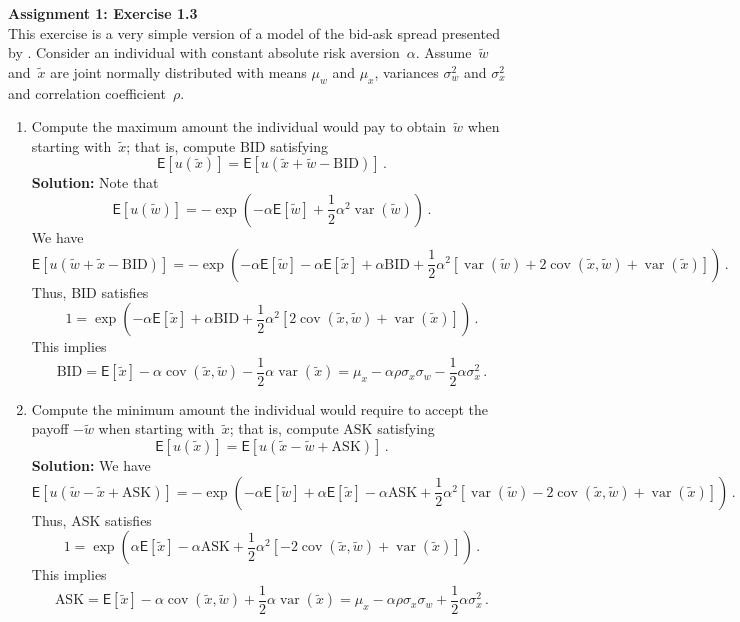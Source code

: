 \documentclass[11pt]{article}
\newcommand{\mye}{\ensuremath{\mathsf{E}}}
\newcommand{\sol}{\textbf{Solution:} \hspace{2ex}}
\theoremstyle{definition}
\DeclareMathOperator{\var}{var} \DeclareMathOperator{\stdev}{stdev}
\DeclareMathOperator{\cov}{cov} \DeclareMathOperator{\corr}{corr}
\begin{document}
%
%
\newpage\noindent \textbf{Assignment 1: Exercise 1.3}\\
\noindent 
  This exercise is a very simple version of a model of the bid-ask spread presented by \citet{Stoll_JF_1978}.
Consider an individual with constant absolute risk aversion~$\alpha$.  Assume~$\tilde{w}$ and~$\tilde{x}$ are joint normally distributed with means $\mu_w$ and $\mu_x$, variances $\sigma_w^2$ and $\sigma_x^2$ and correlation coefficient~$\rho$.
\begin{enumerate}\renewcommand{\labelenumi}{(\alph{enumi})}
\item Compute the maximum amount the individual would pay to obtain~$\tilde{w}$ when starting with~$\tilde{x}$; that is, compute $\text{BID}$ satisfying
$$\mye[u(\tilde{x})] = \mye[u(\tilde{x}+\tilde{w}-\text{BID})]\,.$$
\sol \noindent  Note that
$$\mye[u(\tilde{w})] = - \exp\left( - \alpha \mye[\tilde{w}] + \frac{1}{2}\alpha^2 \var(\tilde{w})\right)\,.$$
We have
$$\mye[u(\tilde{w}+\tilde{x}-\text{BID})] = - \exp\left( - \alpha \mye[\tilde{w}] -\alpha \mye[\tilde{x}] + \alpha \text{BID} + \frac{1}{2}\alpha^2 [\var(\tilde{w})+2\cov(\tilde{x},\tilde{w}) + \var(\tilde{x})]\right)\,.$$
Thus, BID satisfies
$$1 = \exp\left(-\alpha \mye[\tilde{x}] + \alpha \text{BID} + \frac{1}{2}\alpha^2 [2\cov(\tilde{x},\tilde{w}) + \var(\tilde{x})]\right)\,.$$
This implies
$$\text{BID} = \mye[\tilde{x}] - \alpha\cov(\tilde{x},\tilde{w}) - \frac{1}{2}\alpha \var(\tilde{x})=\mu_x-\alpha \rho\sigma_x\sigma_w-\frac{1}{2}\alpha\sigma_x^2\,.$$
\item Compute the minimum amount the individual would require to accept the payoff $-\tilde{w}$ when starting with~$\tilde{x}$; that is, compute $\text{ASK}$ satisfying
$$\mye[u(\tilde{x})] = \mye[u(\tilde{x}-\tilde{w}+\text{ASK})]\,.$$
\sol  We have
$$\mye[u(\tilde{w}-\tilde{x}+\text{ASK})] = - \exp\left( - \alpha \mye[\tilde{w}] +\alpha \mye[\tilde{x}] - \alpha \text{ASK} + \frac{1}{2}\alpha^2 [\var(\tilde{w})-2\cov(\tilde{x},\tilde{w}) + \var(\tilde{x})]\right)\,.$$
Thus, ASK satisfies
$$1 = \exp\left(\alpha \mye[\tilde{x}] - \alpha \text{ASK} + \frac{1}{2}\alpha^2 [-2\cov(\tilde{x},\tilde{w}) + \var(\tilde{x})]\right)\,.$$
This implies
$$\text{ASK} = \mye[\tilde{x}] - \alpha\cov(\tilde{x},\tilde{w}) + \frac{1}{2}\alpha \var(\tilde{x})=\mu_x-\alpha \rho\sigma_x\sigma_w+\frac{1}{2}\alpha\sigma_x^2\,.$$


\end{enumerate}
\end{document}
